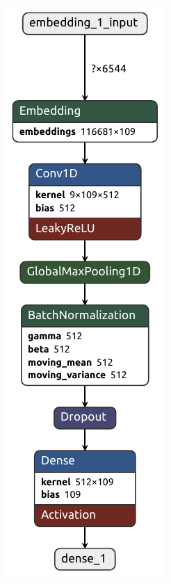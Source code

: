 \begin{minipage}{0.48\linewidth}
	\centering
	\includegraphics[height=0.9\textheight]{Images/model_level_2.keras.pdf}
\end{minipage}
